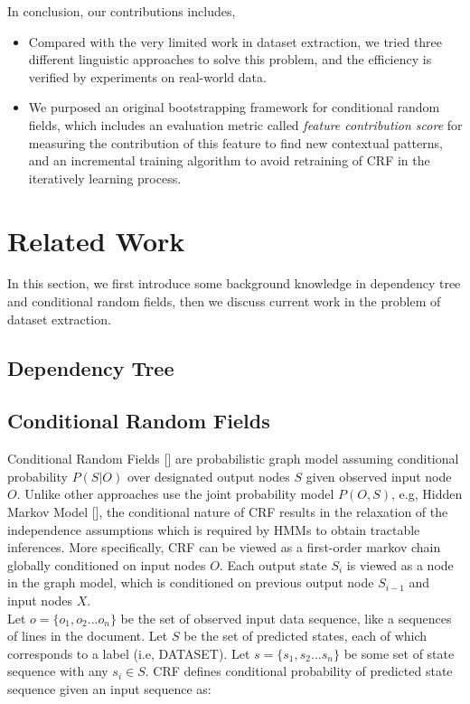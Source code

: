 \documentclass[11pt]{article}
\begin{document}
In conclusion, our contributions includes,
\begin{itemize}
\item Compared with the very limited work in dataset extraction, we tried three different linguistic approaches to solve this problem, and the efficiency is verified by experiments on real-world data.
\item We purposed an original bootstrapping framework for conditional random fields, which includes an evaluation metric called \emph{feature contribution score} for measuring the contribution of this feature to find new contextual patterns, and an incremental training algorithm to avoid retraining of CRF in the iteratively learning process. 
\end{itemize}

\section{Related Work}
In this section, we first introduce some background knowledge in dependency tree and conditional random fields, then we discuss current work in the problem of dataset extraction.
\subsection{Dependency Tree}

\subsection{Conditional Random Fields}
Conditional Random Fields [] are probabilistic graph model assuming conditional probability $P(S|O)$ over designated output nodes $S$ given observed input node $O$. Unlike other approaches use the joint probability model $P(O,S)$, e.g, Hidden Markov Model [], the conditional nature of CRF results in the relaxation of the independence assumptions which is required by HMMs to obtain tractable inferences. More specifically, CRF can be viewed as a first-order markov chain globally conditioned on input nodes $O$. Each output state $S_i$ is viewed as a node in the graph model, which is conditioned on previous output node $S_{i-1}$ and input nodes $X$. \\

Let $o =\{o_1, o_2 ... o_n \}$ be the set of observed input data sequence, like a sequences of lines in the document. Let $S$ be the set of predicted states, each of which corresponds to a label (i.e, DATASET). Let $s = \{ s_1, s_2 ... s_n\}$ be some set of state sequence with any $s_i \in S$. CRF defines conditional probability of predicted state sequence given an input sequence as: 
\end{document}
